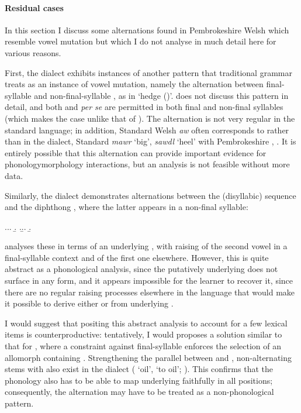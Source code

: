 \paragraph{Residual cases}
\label{sec:marginal-cases}

In this section I discuss some alternations found in Pembrokeshire Welsh which resemble vowel mutation but which I do not analyse in much detail here for various reasons.

First, the dialect exhibits instances of another pattern that traditional grammar \citep[\egm][§III.12]{gyg} treats as an instance of vowel mutation, namely the alternation between final-syllable \ipa{[au]} and non\hyp final\hyp syllable \ipa{[o]}, as in \alternation{[ˈklau]}{[ˈkloðje]} `hedge ()'. \citet{awbery86:_pembr_welsh} does not discuss this pattern in detail, and both \ipa{[o]} and \ipa{[au]} \emph{per se} are permitted  in both final and non\hyp final syllables (which makes the case unlike that of \alternation{[ai]}{[ei]}). The alternation is not very regular in the standard language; in addition, Standard Welsh \emph{aw} often corresponds to \ipa{[ou]} rather than \ipa{[au]} in the dialect, \eg Standard \emph{mawr} `big', \emph{sawdl} `heel' with Pembrokeshire \ipa{[ˈmour]}, \ipa{[ˈsoudul]}. It is entirely possible that this alternation can provide important evidence for phonology\endash morphology interactions, but an analysis is not feasible without more data.

Similarly, the dialect demonstrates alternations between the (disyllabic) sequence \ipa{[ue]} and the diphthong \ipa{[oi]}, where the latter appears in a non-final syllable:

\ex.\a.\a.
\b.
\z.\b.\a.
\b.

\citet{awbery86:_pembr_welsh} analyses these in terms of an underlying , with raising of the second vowel in a final\hyp syllable context and of the first one elsewhere. However, this is quite abstract as a phonological analysis, since the putatively underlying  does not surface in any form, and it appears impossible for the learner to recover it, since there are no regular raising processes elsewhere in the language that would make it possible to derive either \ipa{[oi]} or \ipa{[ue]} from underlying .

I would suggest that positing this abstract analysis to account for a few lexical items is counterproductive: tentatively, I would proposes a solution similar to that for \alternation{[u]}{[ə]}, where a constraint against final-syllable \ipa{[oi]} enforces the selection of an allomorph containing \ipa{[ue]}. Strengthening the parallel between \alternation{[ue]}{[oi]} and \alternation{[u]}{[i]}, non-alternating stems with \ipa{[oi]} also exist in the dialect (\ipa{[ˈoil]} `oil', \ipa{[ˈoilo]} `to oil'; \citealp[\emph{sub vocibus}]{thomas00:_welsh}). This confirms that the phonology also has to be able to map underlying  faithfully in all positions; consequently, the \alternation{[ue]}{[oi]} alternation may have to be treated as a non\hyp phonological pattern.

